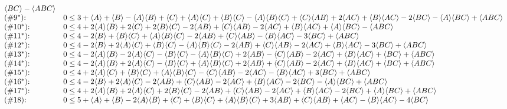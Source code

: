 \begin{align*}
{\begin{array}{ll}
   \langle BC\rangle-\langle ABC\rangle \\
 \text{($\#$} 9^* \text{):  } & 0\leq 3+\langle A\rangle+\langle B\rangle-\langle A\rangle \langle B\rangle+\langle C\rangle+\langle A\rangle \langle C\rangle+\langle B\rangle
   \langle C\rangle-\langle A\rangle \langle B\rangle \langle C\rangle+\langle C\rangle \langle AB\rangle+2 \langle AC\rangle+\langle B\rangle \langle AC\rangle-2 \langle BC\rangle-\langle A\rangle
   \langle BC\rangle+\langle ABC\rangle \\
 \text{($\#$} 10^* \text{):  } & 0\leq 4+2 \langle A\rangle \langle B\rangle+2 \langle C\rangle+2 \langle B\rangle \langle C\rangle-2 \langle AB\rangle+\langle C\rangle \langle AB\rangle-2
   \langle AC\rangle+\langle B\rangle \langle AC\rangle+\langle A\rangle \langle BC\rangle-\langle ABC\rangle \\
 \text{($\#$} 11^* \text{):  } & 0\leq 4-2 \langle B\rangle+\langle B\rangle \langle C\rangle+\langle A\rangle \langle B\rangle \langle C\rangle-2 \langle AB\rangle+\langle C\rangle
   \langle AB\rangle-\langle B\rangle \langle AC\rangle-3 \langle BC\rangle+\langle ABC\rangle \\
 \text{($\#$} 12^* \text{):  } & 0\leq 4-2 \langle B\rangle+2 \langle A\rangle \langle C\rangle+\langle B\rangle \langle C\rangle-\langle A\rangle \langle B\rangle \langle C\rangle-2
   \langle AB\rangle+\langle C\rangle \langle AB\rangle-2 \langle AC\rangle+\langle B\rangle \langle AC\rangle-3 \langle BC\rangle+\langle ABC\rangle \\
 \text{($\#$} 13^* \text{):  } & 0\leq 4-2 \langle A\rangle \langle B\rangle-2 \langle A\rangle \langle C\rangle-\langle B\rangle \langle C\rangle-\langle A\rangle \langle B\rangle
   \langle C\rangle+2 \langle AB\rangle-\langle C\rangle \langle AB\rangle-2 \langle AC\rangle+\langle B\rangle \langle AC\rangle+\langle BC\rangle+\langle ABC\rangle \\
 \text{($\#$} 14^* \text{):  } & 0\leq 4-2 \langle A\rangle \langle B\rangle+2 \langle A\rangle \langle C\rangle-\langle B\rangle \langle C\rangle+\langle A\rangle \langle B\rangle
   \langle C\rangle+2 \langle AB\rangle+\langle C\rangle \langle AB\rangle-2 \langle AC\rangle+\langle B\rangle \langle AC\rangle+\langle BC\rangle+\langle ABC\rangle \\
 \text{($\#$} 15^* \text{):  } & 0\leq 4+2 \langle A\rangle \langle C\rangle+\langle B\rangle \langle C\rangle+\langle A\rangle \langle B\rangle \langle C\rangle-\langle C\rangle \langle AB\rangle-2
   \langle AC\rangle-\langle B\rangle \langle AC\rangle+3 \langle BC\rangle+\langle ABC\rangle \\
 \text{($\#$} 16^* \text{):  } & 0\leq 4-2 \langle B\rangle+2 \langle A\rangle \langle C\rangle-2 \langle AB\rangle+\langle C\rangle \langle AB\rangle-2 \langle AC\rangle+\langle B\rangle
   \langle AC\rangle-2 \langle BC\rangle-\langle A\rangle \langle BC\rangle+\langle ABC\rangle \\
 \text{($\#$} 17^* \text{):  } & 0\leq 4+2 \langle A\rangle \langle B\rangle+2 \langle A\rangle \langle C\rangle+2 \langle B\rangle \langle C\rangle-2 \langle AB\rangle+\langle C\rangle
   \langle AB\rangle-2 \langle AC\rangle+\langle B\rangle \langle AC\rangle-2 \langle BC\rangle+\langle A\rangle \langle BC\rangle+\langle ABC\rangle \\
 \text{($\#$} 18 \text{):  } & 0\leq 5+\langle A\rangle+\langle B\rangle-2 \langle A\rangle \langle B\rangle+\langle C\rangle+\langle B\rangle \langle C\rangle+\langle A\rangle \langle B\rangle
   \langle C\rangle+3 \langle AB\rangle+\langle C\rangle \langle AB\rangle+\langle AC\rangle-\langle B\rangle \langle AC\rangle-4 \langle BC\rangle \\

\end{array}}
\end{align*}

